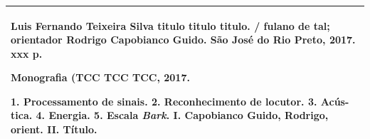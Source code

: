 \documentclass[a4paper,12pt,twoside,openright]{report}
\begin{document}
\begin{tabular}{|p{12.5cm}|}
	\hline
	{\singlespacing
		\vspace*{-20pt}
		\hspace*{+40pt} {\small Luis Fernando Teixeira Silva} \newline
		\hspace*{+40pt} {\small titulo} \newline
		\hspace*{+20pt} {\small titulo} \newline
		\hspace*{+20pt} {\small titulo. / fulano de tal; orientador} \newline
		\hspace*{+20pt} {\small Rodrigo Capobianco Guido. S\~{a}o Jos\'{e} do Rio Preto, 2017.} \newline
		\hspace*{+40pt} {\small xxx p.} \newline
		
		\hspace*{+40pt} {\small Monografia (TCC} \newline
		\hspace*{+20pt} {\small TCC} \newline
		\hspace*{+20pt} {\small TCC, 2017.} \newline \newline
		
		\hspace*{+40pt} {\small 1. Processamento de sinais. 2. Reconhecimento de locutor. 3. Ac\'{u}s-} \newline
		\hspace*{+20pt} {\small tica. 4. Energia. 5. Escala \textit{Bark}. I. Capobianco Guido, Rodrigo, orient.} \newline
		\hspace*{+20pt} {\small II. T\'{i}tulo.} \newline \newline
	}
	\\
	\hline
\end{tabular}

\thispagestyle{empty}
\newpage\ \thispagestyle{empty} \newpage
\thispagestyle{empty}
\newpage\ \thispagestyle{empty} \newpage
\thispagestyle{empty}
\end{document}
